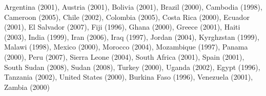Argentina (2001), Austria (2001), Bolivia (2001), Brazil (2000), Cambodia (1998), Cameroon (2005), Chile (2002), Colombia (2005), Costa Rica (2000), Ecuador (2001), El Salvador (2007), Fiji (1996), Ghana (2000), Greece (2001), Haiti (2003), India (1999), Iran (2006), Iraq (1997), Jordan (2004), Kyrghzstan (1999), Malawi (1998), Mexico (2000), Morocco (2004), Mozambique (1997), Panama (2000), Peru (2007), Sierra Leone (2004), South Africa (2001), Spain (2001), South Sudan (2008), Sudan (2008), Turkey (2000), Uganda (2002), Egypt (1996), Tanzania (2002), United States (2000), Burkina Faso (1996), Venezuela (2001), Zambia (2000)